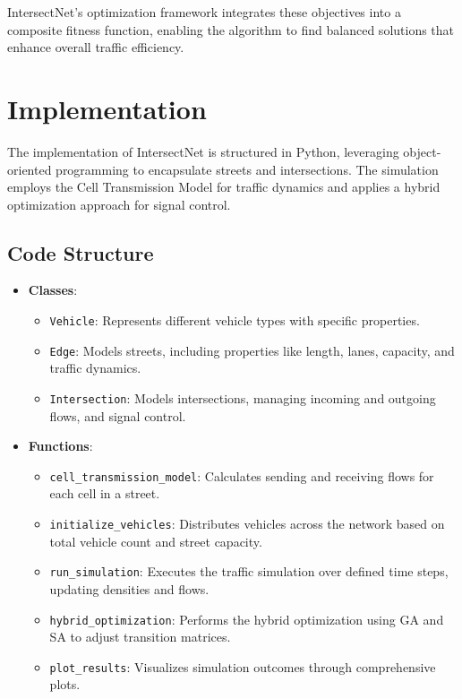 \documentclass[conference]{IEEEtran}
\begin{document}
IntersectNet's optimization framework integrates these objectives into a composite fitness function, enabling the algorithm to find balanced solutions that enhance overall traffic efficiency.

\section{Implementation}

The implementation of IntersectNet is structured in Python, leveraging object-oriented programming to encapsulate streets and intersections. The simulation employs the Cell Transmission Model for traffic dynamics and applies a hybrid optimization approach for signal control.

\subsection{Code Structure}
\begin{itemize}
    \item \textbf{Classes}:
    \begin{itemize}
        \item \texttt{Vehicle}: Represents different vehicle types with specific properties.
        \item \texttt{Edge}: Models streets, including properties like length, lanes, capacity, and traffic dynamics.
        \item \texttt{Intersection}: Models intersections, managing incoming and outgoing flows, and signal control.
    \end{itemize}
    \item \textbf{Functions}:
    \begin{itemize}
        \item \texttt{cell\_transmission\_model}: Calculates sending and receiving flows for each cell in a street.
        \item \texttt{initialize\_vehicles}: Distributes vehicles across the network based on total vehicle count and street capacity.
        \item \texttt{run\_simulation}: Executes the traffic simulation over defined time steps, updating densities and flows.
        \item \texttt{hybrid\_optimization}: Performs the hybrid optimization using GA and SA to adjust transition matrices.
        \item \texttt{plot\_results}: Visualizes simulation outcomes through comprehensive plots.
    \end{itemize}
\end{itemize}
\end{document}
